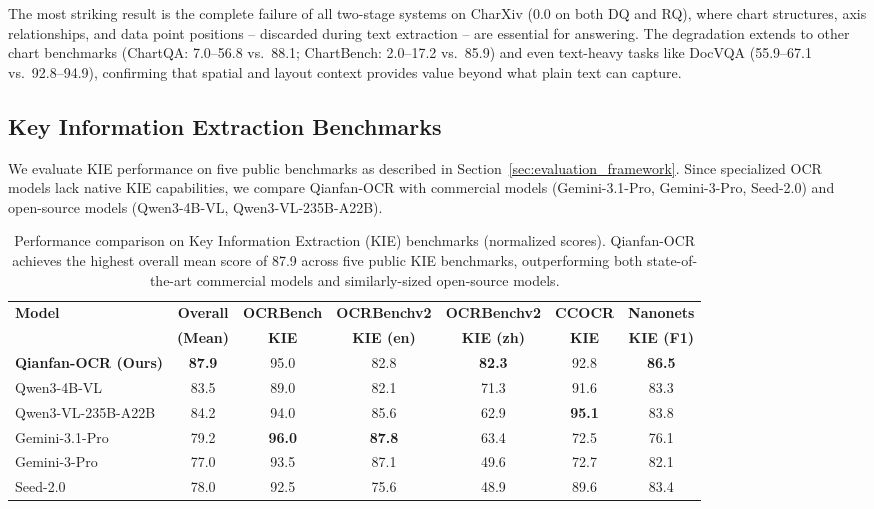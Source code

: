 \documentclass[dvipsnames]{article}
\begin{document}
The most striking result is the complete failure of all two-stage systems on CharXiv (0.0 on both DQ and RQ), where chart structures, axis relationships, and data point positions -- discarded during text extraction -- are essential for answering. The degradation extends to other chart benchmarks (ChartQA: 7.0--56.8 vs.\ 88.1; ChartBench: 2.0--17.2 vs.\ 85.9) and even text-heavy tasks like DocVQA (55.9--67.1 vs.\ 92.8--94.9), confirming that spatial and layout context provides value beyond what plain text can capture.

\subsection{Key Information Extraction Benchmarks}

We evaluate KIE performance on five public benchmarks as described in Section~\ref{sec:evaluation_framework}. Since specialized OCR models lack native KIE capabilities, we compare Qianfan-OCR with commercial models (Gemini-3.1-Pro, Gemini-3-Pro, Seed-2.0) and open-source models (Qwen3-4B-VL, Qwen3-VL-235B-A22B).

\begin{table}[H]
\centering
\small
\setlength{\tabcolsep}{6pt}
\begin{tabular}{l|cccccc}
\toprule
\textbf{Model} & \textbf{Overall} & \textbf{OCRBench} & \textbf{OCRBenchv2} & \textbf{OCRBenchv2} & \textbf{CCOCR} & \textbf{Nanonets} \\
 & \textbf{(Mean)} & \textbf{KIE} & \textbf{KIE (en)} & \textbf{KIE (zh)} & \textbf{KIE} & \textbf{KIE (F1)} \\
\midrule
\textbf{Qianfan-OCR (Ours)} & \textbf{87.9} & 95.0 & 82.8 & \textbf{82.3} & 92.8 & \textbf{86.5} \\
Qwen3-4B-VL & 83.5 & 89.0 & 82.1 & 71.3 & 91.6 & 83.3 \\
Qwen3-VL-235B-A22B & 84.2 & 94.0 & 85.6 & 62.9 & \textbf{95.1} & 83.8 \\
Gemini-3.1-Pro & 79.2 & \textbf{96.0} & \textbf{87.8} & 63.4 & 72.5 & 76.1 \\
Gemini-3-Pro & 77.0 & 93.5 & 87.1 & 49.6 & 72.7 & 82.1 \\
Seed-2.0 & 78.0 & 92.5 & 75.6 & 48.9 & 89.6 & 83.4 \\
\bottomrule
\end{tabular}
\caption{Performance comparison on Key Information Extraction (KIE) benchmarks (normalized scores). Qianfan-OCR achieves the highest overall mean score of 87.9 across five public KIE benchmarks, outperforming both state-of-the-art commercial models and similarly-sized open-source models.}
\label{tab:kie_benchmarks}
\end{table}
\end{document}
